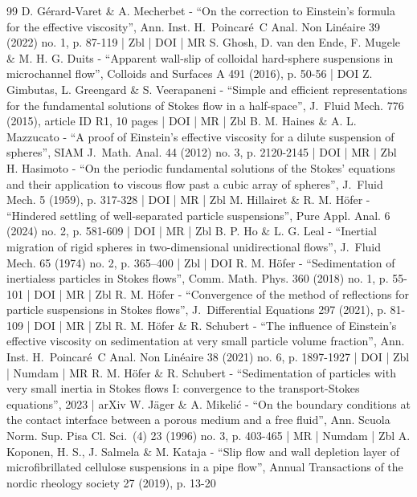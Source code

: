 \documentclass[10pt]{amsart}
\theoremstyle{plain}
\theoremstyle{definition}
\begin{document}
\begin{thebibliography}{99}
D. Gérard-Varet \& A. Mecherbet - “On the correction to Einstein’s formula for the effective viscosity”, Ann. Inst. H. Poincaré C Anal. Non Linéaire 39 (2022) no. 1, p. 87-119 | Zbl | DOI | MR
S. Ghosh, D. van den Ende, F. Mugele \& M. H. G. Duits - “Apparent wall-slip of colloidal hard-sphere suspensions in microchannel flow”, Colloids and Surfaces A 491 (2016), p. 50-56 | DOI
Z. Gimbutas, L. Greengard \& S. Veerapaneni - “Simple and efficient representations for the fundamental solutions of Stokes flow in a half-space”, J. Fluid Mech. 776 (2015), article ID R1, 10 pages | DOI | MR | Zbl
B. M. Haines \& A. L. Mazzucato - “A proof of Einstein’s effective viscosity for a dilute suspension of spheres”, SIAM J. Math. Anal. 44 (2012) no. 3, p. 2120-2145 | DOI | MR | Zbl
H. Hasimoto - “On the periodic fundamental solutions of the Stokes’ equations and their application to viscous flow past a cubic array of spheres”, J. Fluid Mech. 5 (1959), p. 317-328 | DOI | MR | Zbl
M. Hillairet \& R. M. Höfer - “Hindered settling of well-separated particle suspensions”, Pure Appl. Anal. 6 (2024) no. 2, p. 581-609 | DOI | MR | Zbl
B. P. Ho \& L. G. Leal - “Inertial migration of rigid spheres in two-dimensional unidirectional flows”, J. Fluid Mech. 65 (1974) no. 2, p. 365–400 | Zbl | DOI
R. M. Höfer - “Sedimentation of inertialess particles in Stokes flows”, Comm. Math. Phys. 360 (2018) no. 1, p. 55-101 | DOI | MR | Zbl
R. M. Höfer - “Convergence of the method of reflections for particle suspensions in Stokes flows”, J. Differential Equations 297 (2021), p. 81-109 | DOI | MR | Zbl
R. M. Höfer \& R. Schubert - “The influence of Einstein’s effective viscosity on sedimentation at very small particle volume fraction”, Ann. Inst. H. Poincaré C Anal. Non Linéaire 38 (2021) no. 6, p. 1897-1927 | DOI | Zbl | Numdam | MR
R. M. Höfer \& R. Schubert - “Sedimentation of particles with very small inertia in Stokes flows I: convergence to the transport-Stokes equations”, 2023 | arXiv
W. Jäger \& A. Mikelić - “On the boundary conditions at the contact interface between a porous medium and a free fluid”, Ann. Scuola Norm. Sup. Pisa Cl. Sci. (4) 23 (1996) no. 3, p. 403-465 | MR | Numdam | Zbl
A. Koponen, H. S., J. Salmela \& M. Kataja - “Slip flow and wall depletion layer of microfibrillated cellulose suspensions in a pipe flow”, Annual Transactions of the nordic rheology society 27 (2019), p. 13-20

\end{thebibliography}
\end{document}
